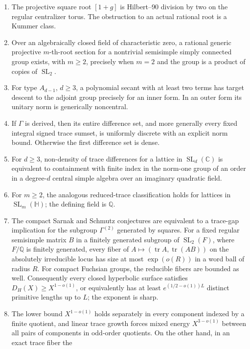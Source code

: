 \documentclass[11pt,reqno]{amsart}
\theoremstyle{definition}
\theoremstyle{remark}
\newcommand{\C}{\mathbb C}
\newcommand{\Q}{\mathbb Q}
\newcommand{\Tr}{\operatorname{tr}}
\newcommand{\SL}{\operatorname{SL}}
\begin{document}
\begin{enumerate}[label=\textup{(\roman*)}]
\item The projective square root \([1+g]\) is Hilbert--90 division by two on
the regular centralizer torus.  The obstruction to an actual rational root is
a Kummer class.
\item Over an algebraically closed field of characteristic zero, a rational
generic projective \(m\)-th-root section for a nontrivial semisimple simply
connected group exists, with \(m\ge2\), precisely when \(m=2\) and the group
is a product of copies of \(\SL_2\).
\item For type \(A_{d-1}\), \(d\ge3\), a polynomial secant with at least two
terms has target descent to the adjoint group precisely for an inner form.  In
an outer form its unitary norm is generically noncentral.
\item If \(\Gamma\) is derived, then its entire difference set, and more
generally every fixed integral signed trace sumset, is uniformly discrete with
an explicit norm bound.  Otherwise the first difference set is dense.
\item For \(d\ge3\), non-density of trace differences for a lattice in
\(\SL_d(\C)\) is equivalent to containment with finite index in the norm-one
group of an order in a degree-\(d\) central simple algebra over an imaginary
quadratic field.
\item For \(m\ge2\), the analogous reduced-trace classification holds for
lattices in \(\SL_m(\mathbb H)\); the defining field is \(\Q\).
\item The compact Sarnak and Schmutz conjectures are equivalent to a
trace-gap implication for the subgroup \(\Gamma^{(2)}\) generated by
squares.  For a fixed regular semisimple matrix \(B\) in a finitely generated
subgroup of \(\SL_2(F)\), where \(F/\Q\) is finitely generated, every fiber
of \(A\mapsto(\Tr A,\Tr(AB))\) on the absolutely irreducible locus has
size at most \(\exp(o(R))\) in a word ball of radius \(R\).
For compact Fuchsian groups, the reducible fibers are bounded as well.
Consequently every closed hyperbolic surface satisfies
\(D_H(X)\ge X^{1-o(1)}\), or equivalently has at least
\(e^{(1/2-o(1))L}\) distinct primitive lengths up to \(L\); the exponent is
sharp.
\item The lower bound \(X^{1-o(1)}\) holds separately in every component
indexed by a finite quotient, and linear trace growth forces mixed energy
\(X^{3-o(1)}\) between all pairs of components in odd-order quotients.  On
the other hand, in an exact trace fiber the

\end{enumerate}
\end{document}
